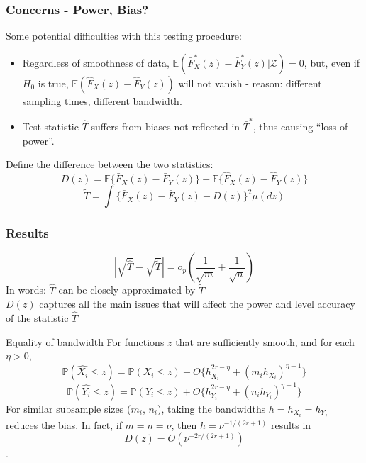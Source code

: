 \documentclass[10pt,dvipsnames,table]{beamer}
\newcommand{\Exp}{\mathds{E}}
\newcommand{\Prob}{\mathds{P}}
\begin{document}
\begin{frame}
\frametitle{Concerns - Power, Bias?}
Some potential difficulties with this testing procedure:
\begin{itemize}
\item  Regardless of smoothness of data, $\Exp(\bar{F}^*_X(z) - \bar{F}^*_Y(z) | \mathcal{Z}) = 0$, but, even if $H_0$ is true, $\Exp(\hat{F}_X(z) - \hat{F}_Y(z))$ will not vanish - reason: different sampling times, different bandwidth.
\item  Test statistic $\hat{T}$ suffers from biases not reflected in $\bar{T}^*$, thus causing ``loss of power''.  
\end{itemize}

Define the difference between the two statistics: 
\[D(z) = \Exp\{\bar{F}_X(z) - \bar{F}_Y(z)\} - \Exp\{\hat{F}_X(z) - \hat{F}_Y(z)\} \]
\[\widetilde{T} = \int \{\bar{F}_X(z) - \bar{F}_Y(z) - D(z) \}^2 \mu(dz) \]
\end{frame}

\begin{frame}
\frametitle{Results}
\begin{theorem}
\[|\sqrt{\hat{T}} - \sqrt{\widetilde{T}}| = o_p(\frac{1}{\sqrt{m}} + \frac{1}{\sqrt{n}})\]
In words: $\hat{T}$ can be closely approximated by $\widetilde{T}$\\
$D(z)$ captures all the main issues that will affect the power and level accuracy of the statistic $\hat{T}$
\end{theorem}

\begin{block}{Equality of bandwidth}
For functions $z$ that are sufficiently smooth, and for each $\eta > 0$,
\[\Prob(\hat{X_i} \leq z) = \Prob(X_i \leq z) + O\{h_{X_i}^{2r - \eta} + (m_ih_{X_i})^{\eta - 1} \}\]
\[\Prob(\hat{Y_i} \leq z) = \Prob(Y_i \leq z) + O\{h_{Y_i}^{2r - \eta} + (n_ih_{Y_i})^{\eta - 1} \}\]
For similar subsample sizes ($m_i$, $n_i$), taking the bandwidths $h = h_{X_i} = h_{Y_j}$ reduces the bias. 
 In fact, if $m=n=\nu$, then $h=\nu^{-1/(2r+1)}$ results in \[D(z) = O(\nu^{-2r/(2r+1)})\]. 
\end{block}
\end{frame}
\end{document}
